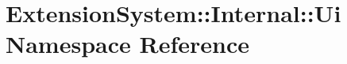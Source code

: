 \hypertarget{namespace_extension_system_1_1_internal_1_1_ui}{\section{\-Extension\-System\-:\-:\-Internal\-:\-:\-Ui \-Namespace \-Reference}
\label{namespace_extension_system_1_1_internal_1_1_ui}
}

